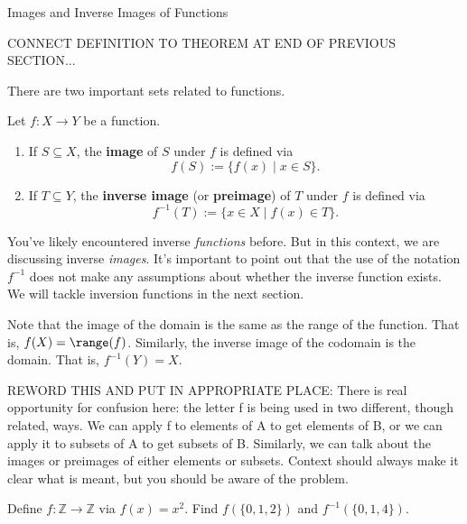 \begin{section}{Images and Inverse Images of Functions}\label{sec:Images and Inverse Images}

CONNECT DEFINITION TO THEOREM AT END OF PREVIOUS SECTION...

There are two important sets related to functions.

\begin{definition}
Let $f:X\to Y$ be a function.  \begin{enumerate}[label=\textrm{(\alph*)}]
\item If $S\subseteq X$, the \textbf{image} of $S$ under $f$ is defined via
\[
f(S):=\{f(x) \mid  x\in S\}.
\]
\item  If $T\subseteq Y$, the \textbf{inverse image} (or \textbf{preimage}) of $T$ under $f$ is defined via
\[
f^{-1}(T):=\{x\in X \mid  f(x)\in T\}.
\]
\end{enumerate}
\end{definition}

You've likely encountered inverse \emph{functions} before. But in this context, we are discussing inverse \emph{images}. It's important to point out that the use of the notation $f^{-1}$ does not make any assumptions about whether the inverse function exists. We will tackle inversion functions in the next section.

Note that the image of the domain is the same as the range of the function.  That is, $f(X)=\range(f)$. Similarly, the inverse image of the codomain is the domain.  That is, $f^{-1}(Y)=X$.

REWORD THIS AND PUT IN APPROPRIATE PLACE: There is real opportunity for confusion here: the letter f is being used in two different, though related, ways. We can apply f to elements of A to get elements of B, or we can apply it to subsets of A to get subsets of B. Similarly, we can talk about the images or preimages of either elements or subsets. Context should always make it clear what is meant, but you should be aware of the problem.

\begin{problem}
Define $f:\mathbb{Z}\to\mathbb{Z}$ via $f(x)=x^2$. Find $f(\{0,1,2\})$ and $f^{-1}(\{0,1,4\})$.
\end{problem}


\end{section}
